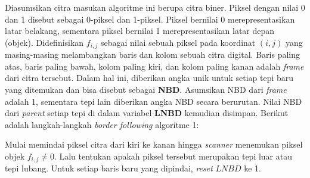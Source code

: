     Diasumsikan citra masukan algoritme ini berupa citra biner. Piksel dengan nilai 0 dan 1 disebut sebagai 0-piksel dan 1-piksel. Piksel bernilai 0 merepresentasikan latar belakang, sementara piksel bernilai 1 merepresentasikan latar depan (objek). Didefinisikan $f_{i, j}$ sebagai nilai sebuah piksel pada koordinat $(i, j)$ yang masing-masing melambangkan baris dan kolom sebuah citra digital. Baris paling atas, baris paling bawah, kolom paling kiri, dan kolom paling kanan adalah \textit{frame} dari citra tersebut. Dalam hal ini, diberikan angka unik untuk setiap tepi baru yang ditemukan dan bisa disebut sebagai \textbf{NBD}. Asumsikan NBD dari \textit{frame} adalah 1, sementara tepi lain diberikan angka NBD secara berurutan. Nilai NBD dari \textit{parent} setiap tepi di dalam variabel \textbf{LNBD} kemudian disimpan. Berikut adalah langkah-langkah \textit{border following} algoritme 1:
    
    Mulai memindai piksel citra dari kiri ke kanan hingga \textit{scanner} menemukan piksel objek $f_{i, j} \neq 0$. Lalu tentukan apakah piksel tersebut merupakan tepi luar atau tepi lubang. Untuk setiap baris baru yang dipindai, \textit{reset} $LNBD$ ke 1.\\\\
    
